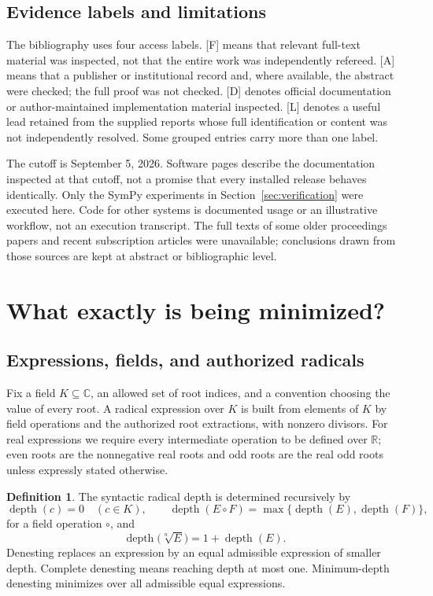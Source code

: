 \documentclass[11pt,letterpaper]{article}
\numberwithin{equation}{section}
\theoremstyle{definition}
\newtheorem{definition}[theorem]{Definition}
\theoremstyle{remark}
\newcommand{\R}{\mathbb{R}}
\newcommand{\C}{\mathbb{C}}
\newcommand{\depth}{\operatorname{depth}}
\newcommand{\status}[1]{\textsf{\small[#1]}}
\begin{document}
\subsection{Evidence labels and limitations}
The bibliography uses four access labels. \status{F} means that relevant full-text material was inspected, not that the entire work was independently refereed. \status{A} means that a publisher or institutional record and, where available, the abstract were checked; the full proof was not checked. \status{D} denotes official documentation or author-maintained implementation material inspected. \status{L} denotes a useful lead retained from the supplied reports whose full identification or content was not independently resolved. Some grouped entries carry more than one label.

The cutoff is September 5, 2026. Software pages describe the documentation inspected at that cutoff, not a promise that every installed release behaves identically. Only the SymPy experiments in Section~\ref{sec:verification} were executed here. Code for other systems is documented usage or an illustrative workflow, not an execution transcript. The full texts of some older proceedings papers and recent subscription articles were unavailable; conclusions drawn from those sources are kept at abstract or bibliographic level.

\section{What exactly is being minimized?}\label{sec:definitions}

\subsection{Expressions, fields, and authorized radicals}
Fix a field $K\subseteq\C$, an allowed set of root indices, and a convention choosing the value of every root. A radical expression over $K$ is built from elements of $K$ by field operations and the authorized root extractions, with nonzero divisors. For real expressions we require every intermediate operation to be defined over $\R$; even roots are the nonnegative real roots and odd roots are the real odd roots unless expressly stated otherwise.

\begin{definition}
The syntactic radical depth is determined recursively by
\[
\depth(c)=0\quad(c\in K),\qquad
\depth(E\mathbin{\circ}F)=\max\{\depth(E),\depth(F)\},
\]
for a field operation $\circ$, and
\[
\depth\bigl(\sqrt[n]{E}\bigr)=1+\depth(E).
\]
Denesting replaces an expression by an equal admissible expression of smaller depth. Complete denesting means reaching depth at most one. Minimum-depth denesting minimizes over all admissible equal expressions.
\end{definition}
\end{document}
